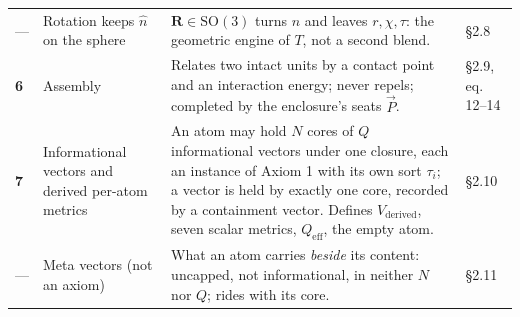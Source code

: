 \documentclass[10.5pt]{article}
\begin{document}
{\begin{longtable}{L{0.8cm}L{3.1cm}L{10.3cm}L{1.8cm}}
— & Rotation keeps $\hat n$ on the sphere & $\mathbf R\in\mathrm{SO}(3)$ turns $\hat n$ and leaves $r,\chi,\tau$: the geometric engine of $T$, not a second blend. & §2.8 \\
\textbf{6} & Assembly & Relates two intact units by a contact point and an interaction energy; never repels; completed by the enclosure's seats $\vec P$. & §2.9, eq. 12–14 \\
\textbf{7} & Informational vectors and derived per-atom metrics & An atom may hold $N$ cores of $Q$ informational vectors under one closure, each an instance of Axiom 1 with its own sort $\tau_i$; a vector is held by exactly one core, recorded by a containment vector. Defines $V_{\text{derived}}$, seven scalar metrics, $Q_{\text{eff}}$, the empty atom. & §2.10 \\
— & Meta vectors (not an axiom) & What an atom carries \emph{beside} its content: uncapped, not informational, in neither $N$ nor $Q$; rides with its core. & §2.11 \\
\bottomrule
\end{longtable}}
\end{document}
